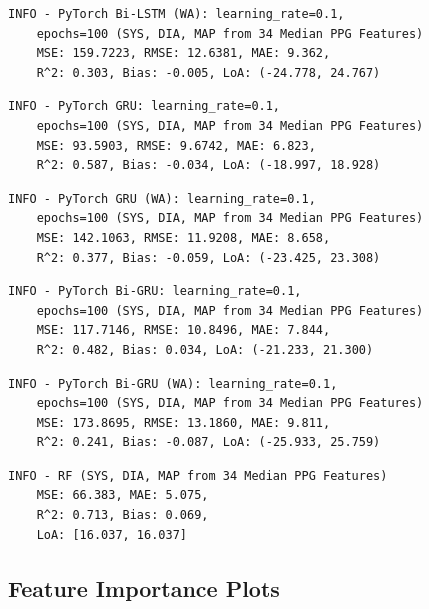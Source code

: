 \begin{verbatim}
INFO - PyTorch Bi-LSTM (WA): learning_rate=0.1,
    epochs=100 (SYS, DIA, MAP from 34 Median PPG Features)
    MSE: 159.7223, RMSE: 12.6381, MAE: 9.362,
    R^2: 0.303, Bias: -0.005, LoA: (-24.778, 24.767)
\end{verbatim}

\begin{verbatim}
INFO - PyTorch GRU: learning_rate=0.1,
    epochs=100 (SYS, DIA, MAP from 34 Median PPG Features)
    MSE: 93.5903, RMSE: 9.6742, MAE: 6.823,
    R^2: 0.587, Bias: -0.034, LoA: (-18.997, 18.928)
\end{verbatim}

\begin{verbatim}
INFO - PyTorch GRU (WA): learning_rate=0.1,
    epochs=100 (SYS, DIA, MAP from 34 Median PPG Features)
    MSE: 142.1063, RMSE: 11.9208, MAE: 8.658,
    R^2: 0.377, Bias: -0.059, LoA: (-23.425, 23.308)
\end{verbatim}

\begin{verbatim}
INFO - PyTorch Bi-GRU: learning_rate=0.1,
    epochs=100 (SYS, DIA, MAP from 34 Median PPG Features)
    MSE: 117.7146, RMSE: 10.8496, MAE: 7.844,
    R^2: 0.482, Bias: 0.034, LoA: (-21.233, 21.300)
\end{verbatim}

\begin{verbatim}
INFO - PyTorch Bi-GRU (WA): learning_rate=0.1,
    epochs=100 (SYS, DIA, MAP from 34 Median PPG Features)
    MSE: 173.8695, RMSE: 13.1860, MAE: 9.811,
    R^2: 0.241, Bias: -0.087, LoA: (-25.933, 25.759)
\end{verbatim}

\begin{verbatim}
INFO - RF (SYS, DIA, MAP from 34 Median PPG Features)
    MSE: 66.383, MAE: 5.075,
    R^2: 0.713, Bias: 0.069,
    LoA: [16.037, 16.037]
\end{verbatim}

\newpage

\subsection{Feature Importance Plots}\label{subsec:plots_fi}

